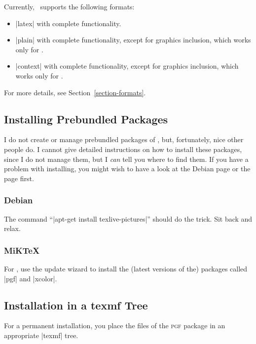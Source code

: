 Currently, \pgfname\ supports the following formats:
%
\begin{itemize}
    \item |latex| with complete functionality.
    \item |plain| with complete functionality, except for graphics inclusion,
        which works only for .
    \item |context| with complete functionality, except for graphics
        inclusion, which works only for .
\end{itemize}

For more details, see Section~\ref{section-formats}.


\subsection{Installing Prebundled Packages}

I do not create or manage prebundled packages of \pgfname, but, fortunately,
nice other people do. I cannot give detailed instructions on how to install
these packages, since I do not manage them, but I \emph{can} tell you where to
find them. If you have a problem with installing, you might wish to have a look
at the Debian page or the  page first.


\subsubsection{Debian}

The command ``|apt-get install texlive-pictures|'' should do the trick.
Sit back and relax.


\subsubsection{MiKTeX}

For , use the update wizard to install the (latest versions of the)
packages called |pgf| and |xcolor|.


\subsection{Installation in a texmf Tree}

For a permanent installation, you place the files of the \textsc{pgf} package
in an appropriate |texmf| tree.

